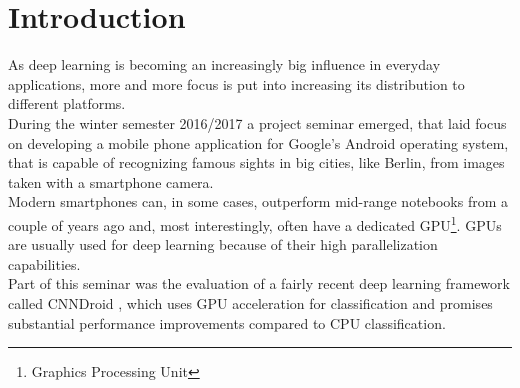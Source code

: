 \section{Introduction}
As deep learning is becoming an increasingly big influence in everyday applications, more and more focus is put into increasing its distribution to different platforms.\\
During the winter semester 2016/2017 a project seminar emerged, that laid focus on developing a mobile phone application for Google's Android operating system, that is capable of recognizing famous sights in big cities, like Berlin, from images taken with a smartphone camera.\\
Modern smartphones can, in some cases, outperform mid-range notebooks from a couple of years ago and, most interestingly, often have a dedicated GPU\footnote{Graphics Processing Unit}. GPUs are usually used for deep learning because of their high parallelization capabilities.\\
Part of this seminar was the evaluation of a fairly recent deep learning framework called CNNDroid \cite{cnndroid2016}, which uses GPU acceleration for classification and promises substantial performance improvements compared to CPU classification.